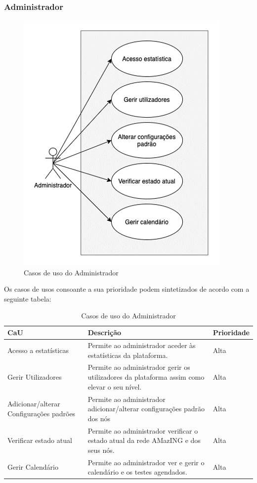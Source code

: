 \subsubsection{Administrador}
\begin{figure}[!ht]
    \centering
    \includegraphics[height=0.4\textheight]{images/CaU2.png}
    \caption{Casos de uso do Administrador}
    \label{fig:usage}
\end{figure}
Os casos de usos consoante a sua prioridade podem sintetizados de acordo com a seguinte tabela:
\begin{table}[ht]
    \centering
        \begin{tabular}{p{}p{}p{}}
            \hline
            \textbf{CaU} &	\textbf{Descrição} &	\textbf{Prioridade} \\ 
            \hline
            Acesso a estatísticas & Permite ao administrador aceder às estatísticas da plataforma. & Alta \\
            \hline
            Gerir Utilizadores & Permite ao administrador gerir os utilizadores da plataforma assim como elevar o seu nível. & Alta \\
            \hline
            Adicionar/alterar Configurações padrões & Permite ao administrador adicionar/alterar configurações padrão dos nós & Alta \\
            \hline
            Verificar estado atual & Permite ao administrador verificar o estado atual da rede AMazING e dos seus nós. & Alta \\
            \hline
            Gerir Calendário & Permite ao administrador ver e gerir o calendário e os testes agendados. & Alta \\
            \hline
        \end{tabular}
    \caption{Casos de uso do Administrador}
    \label{myTable}
\end{table}


